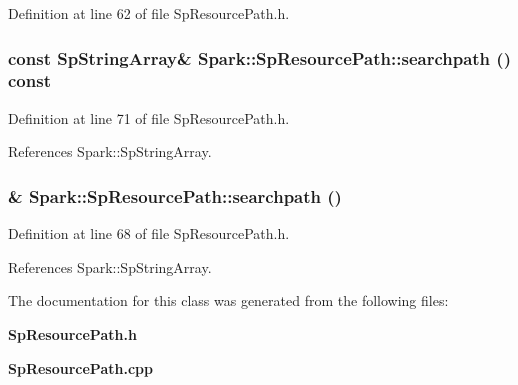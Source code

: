 Definition at line 62 of file Sp\-Resource\-Path.h.
\subsubsection{\setlength{\rightskip}{0pt plus 5cm}const {\bf Sp\-String\-Array}\& Spark::Sp\-Resource\-Path::searchpath () const\hspace{0.3cm}{\tt  [inline]}}\label{classSpark_1_1SpResourcePath_a5}


Definition at line 71 of file Sp\-Resource\-Path.h.

References Spark::Sp\-String\-Array.
\subsubsection{\& Spark::Sp\-Resource\-Path::searchpath ()\hspace{0.3cm}{\tt  [inline]}}\label{classSpark_1_1SpResourcePath_a4}


Definition at line 68 of file Sp\-Resource\-Path.h.

References Spark::Sp\-String\-Array.

The documentation for this class was generated from the following files:\begin{CompactItemize}
\item 
{\bf Sp\-Resource\-Path.h}\item 
{\bf Sp\-Resource\-Path.cpp}\end{CompactItemize}

